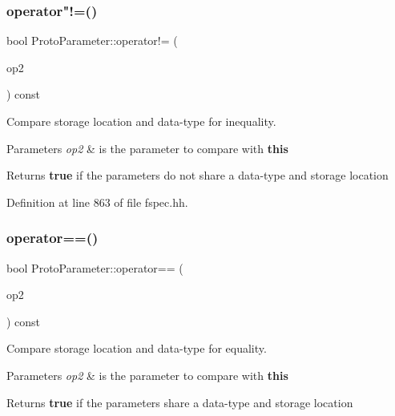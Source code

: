 \subsubsection{\texorpdfstring{operator"!=()}{operator!=()}}
{\footnotesize\ttfamily bool Proto\+Parameter\+::operator!= (\begin{DoxyParamCaption}\item[{const \mbox{\hyperlink{class_proto_parameter}{Proto\+Parameter}} \&}]{op2 }\end{DoxyParamCaption}) const\hspace{0.3cm}{\ttfamily [inline]}}



Compare storage location and data-\/type for inequality. 


\begin{DoxyParams}{Parameters}
{\em op2} & is the parameter to compare with {\bfseries{this}} \\
\hline
\end{DoxyParams}
\begin{DoxyReturn}{Returns}
{\bfseries{true}} if the parameters do not share a data-\/type and storage location 
\end{DoxyReturn}


Definition at line 863 of file fspec.\+hh.

\mbox{\label{class_proto_parameter_a61ce8ecb7464780b491a8e1ceb7144e8}} 
\subsubsection{\texorpdfstring{operator==()}{operator==()}}
{\footnotesize\ttfamily bool Proto\+Parameter\+::operator== (\begin{DoxyParamCaption}\item[{const \mbox{\hyperlink{class_proto_parameter}{Proto\+Parameter}} \&}]{op2 }\end{DoxyParamCaption}) const\hspace{0.3cm}{\ttfamily [inline]}}



Compare storage location and data-\/type for equality. 


\begin{DoxyParams}{Parameters}
{\em op2} & is the parameter to compare with {\bfseries{this}} \\
\hline
\end{DoxyParams}
\begin{DoxyReturn}{Returns}
{\bfseries{true}} if the parameters share a data-\/type and storage location 
\end{DoxyReturn}


